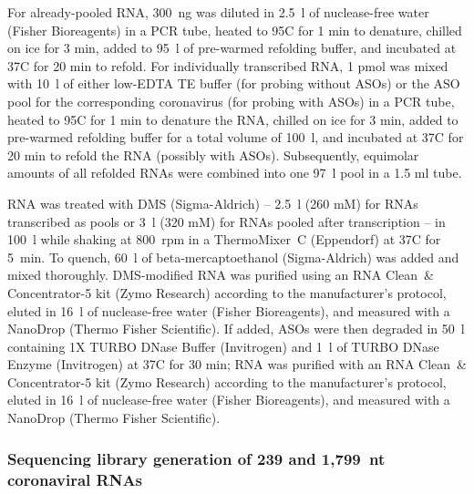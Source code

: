 \documentclass[main.tex]{subfiles}
\begin{document}
For already-pooled RNA, 300~ng was diluted in 2.5~\textmu l of nuclease-free water (Fisher Bioreagents) in a PCR tube, heated to 95\textdegree C for 1 min to denature, chilled on ice for 3 min, added to 95~\textmu l of pre-warmed refolding buffer, and incubated at 37\textdegree C for 20 min to refold.
For individually transcribed RNA, 1 pmol was mixed with 10~\textmu l of either low-EDTA TE buffer (for probing without ASOs) or the ASO pool for the corresponding coronavirus (for probing with ASOs) in a PCR tube, heated to 95\textdegree C for 1 min to denature the RNA, chilled on ice for 3 min, added to pre-warmed refolding buffer for a total volume of 100~\textmu l, and incubated at 37\textdegree C for 20 min to refold the RNA (possibly with ASOs).
Subsequently, equimolar amounts of all refolded RNAs were combined into one 97~\textmu l pool in a 1.5 ml tube.

RNA was treated with DMS (Sigma-Aldrich) -- 2.5~\textmu l (260 mM) for RNAs transcribed as pools or 3~\textmu l (320 mM) for RNAs pooled after transcription -- in 100~\textmu l while shaking at 800~rpm in a ThermoMixer~C (Eppendorf) at 37\textdegree C for 5~min.
To quench, 60~\textmu l of beta-mercaptoethanol (Sigma-Aldrich) was added and mixed thoroughly.
DMS-modified RNA was purified using an RNA Clean~\& Concentrator-5 kit (Zymo Research) according to the manufacturer's protocol, eluted in 16~\textmu l of nuclease-free water (Fisher Bioreagents), and measured with a NanoDrop (Thermo Fisher Scientific).
If added, ASOs were then degraded in 50~\textmu l containing 1X TURBO DNase Buffer (Invitrogen) and 1~\textmu l of TURBO DNase Enzyme (Invitrogen) at 37\textdegree C for 30 min; RNA was purified with an RNA Clean~\& Concentrator-5 kit (Zymo Research) according to the manufacturer's protocol, eluted in 16~\textmu l of nuclease-free water (Fisher Bioreagents), and measured with a NanoDrop (Thermo Fisher Scientific).

\subsubsection{Sequencing library generation of 239 and 1,799~nt coronaviral RNAs}
\end{document}
